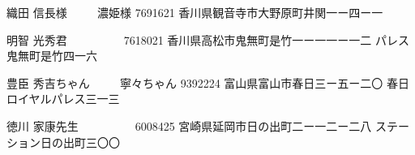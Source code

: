 \documentclass[]{jletteraddress}
\begin{document}
\addaddress
  {織田 信長}{様}    
  {　　 濃姫}{様}
  {7691621}
  {香川県観音寺市大野原町井関一ー四ー一}    
  {}

\addaddress
  {明智 光秀}{君}    
  {　　 　　}{}    
  {7618021}
  {香川県高松市鬼無町是竹一ー一一ー一二}    
  {パレス鬼無町是竹四一六}

\addaddress
  {豊臣 秀吉}{ちゃん}  
  {　　 寧々}{ちゃん}  
  {9392224}
  {富山県富山市春日三ー五ー二〇}            
  {春日ロイヤルパレス三一三}

\addaddress
  {徳川 家康}{先生}    
  {　　 　　}{}    
  {6008425}
  {宮崎県延岡市日の出町二ー一二ー二八}      
  {ステーション日の出町三〇〇}
\end{document}
